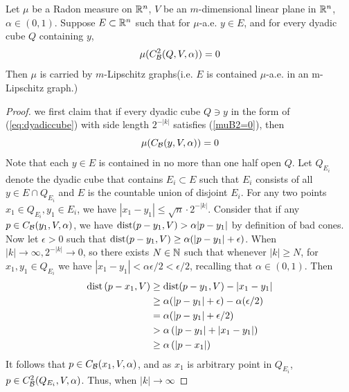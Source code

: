 \begin{lemma}\label{lemma:CBQ2carried}
    Let $\mu$ be a Radon measure on $\mathbb{R}^n$, $V$ be an $m$-dimensional linear plane in $\mathbb{R}^n$, $\alpha\in(0,1)$. Suppose $E\subset \mathbb{R}^n$ such that for $\mu$-a.e. $y\in E$, and for every dyadic cube $Q$ containing $y$, 
    \begin{equation}\label{muB2=0}
        \mu(C_\mathcal B^2(Q, V, \alpha)) = 0
    \end{equation}
    Then $\mu$ is carried by $m$-Lipschitz graphs(i.e. $E$ is contained $\mu$-a.e. in an m-Lipschitz graph.)
\end{lemma}

\begin{proof}
    we first claim that if every dyadic cube $Q\ni y$ in the form of (\ref{eq:dyadiccube}) with side length $2^{-|k|}$ satisfies (\ref{muB2=0}), 
    then
    \begin{equation}\label{muBx=0}
        \mu(C_\mathcal B(y, V, \alpha)) = 0
    \end{equation}
    Note that each $y\in E$ is contained in no more than one half open $Q$. Let $Q_{E_i}$ denote the dyadic cube that contains $E_i\subset E$ such that $E_i$ consists of all $y\in E\cap Q_{E_i}$ and $E$ is the countable union of disjoint $E_i$. For any two points $x_1\in Q_{E_i}, y_1\in E_i$, we have $|x_1-y_1|\leq \sqrt{n}\cdot 2^{-|k|}$. Consider that if any $p\in C_\mathcal B(y_1, V, \alpha)$, we have $\operatorname{dist}(p-y_1, V) > \alpha|p-y_1|$ by definition of bad cones. Now let $\epsilon>0$ such that $\operatorname{dist}(p-y_1, V) \geq \alpha (|p-y_1|+\epsilon)$. When $|k|\rightarrow \infty, 2^{-|k|}\rightarrow 0$, so there exists $N\in\mathbb{N}$ such that whenever $|k|\geq N$, for $x_1, y_1\in Q_{E_i}$ we have $|x_1-y_1|<\alpha\epsilon/2<\epsilon/2$, recalling that $\alpha\in(0,1)$. Then
\begin{equation*}
    \begin{aligned} 
        \operatorname{dist}\left(p-x_1, V\right) & \geq \operatorname{dist}(p-y_1, V)-\left|x_1-y_1\right| \\ 
        & \geq \alpha(|p-y_1|+\epsilon)-\alpha(\epsilon / 2) \\ 
        & =\alpha(|p-y_1|+\epsilon / 2) \\ 
        & >\alpha\left(|p-y_1|+\left|x_1-y_1\right|\right) \\ 
        & \geq \alpha\left(\left|p-x_1\right|\right) 
\end{aligned}
\end{equation*}
It follows that $p\in C_{\mathcal B}(x_1, V, \alpha)$, and as $x_1$ is arbitrary point in $Q_{E_i}$, $p\in C_\mathcal B^2(Q_{E_i}, V, \alpha)$. Thus, when $|k|\rightarrow \infty$

\end{proof}
